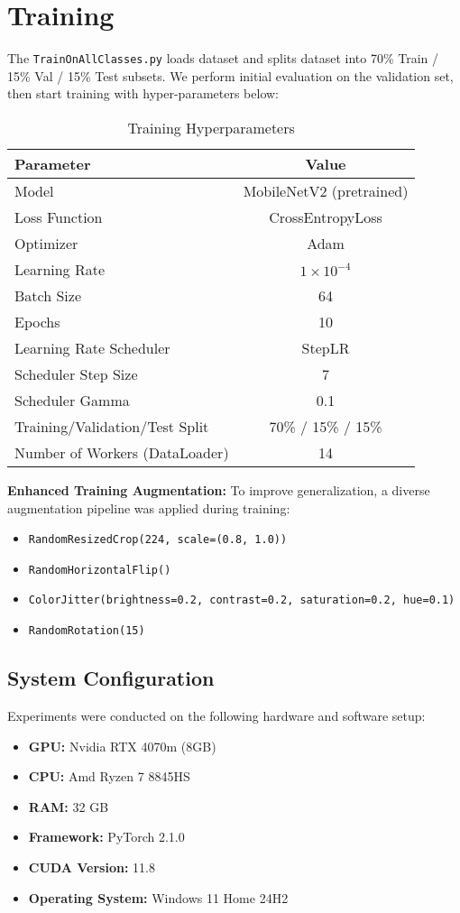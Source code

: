 \documentclass[a4paper,12pt]{report}%
\begin{document}
\section{Training}
The \texttt{TrainOnAllClasses.py} loads dataset and splits dataset into 70\% Train / 15\% Val / 15\% Test subsets. We perform initial evaluation on the validation set, then start training with hyper-parameters below:
\begin{table}[H]
\centering
\caption{Training Hyperparameters}
\begin{tabular}{|l|c|}
\hline
\textbf{Parameter} & \textbf{Value} \\
\hline
Model & MobileNetV2 (pretrained) \\
Loss Function & CrossEntropyLoss \\
Optimizer & Adam \\
Learning Rate & $1 \times 10^{-4}$ \\
Batch Size & 64 \\
Epochs & 10 \\
Learning Rate Scheduler & StepLR \\
Scheduler Step Size & 7 \\
Scheduler Gamma & 0.1 \\
Training/Validation/Test Split & 70\% / 15\% / 15\% \\
Number of Workers (DataLoader) & 14 \\
\hline
\end{tabular}
\end{table}

\textbf{Enhanced Training Augmentation:} To improve generalization, a diverse augmentation pipeline was applied during training:
\begin{itemize}
  \item \texttt{RandomResizedCrop(224, scale=(0.8, 1.0))}
  \item \texttt{RandomHorizontalFlip()}
  \item \texttt{ColorJitter(brightness=0.2, contrast=0.2, saturation=0.2, hue=0.1)}
  \item \texttt{RandomRotation(15)}
\end{itemize}


\subsection{System Configuration}
Experiments were conducted on the following hardware and software setup:

\begin{itemize}
    \item \textbf{GPU:} Nvidia RTX 4070m (8GB)
    \item \textbf{CPU:} Amd Ryzen 7 8845HS
    \item \textbf{RAM:} 32 GB
    \item \textbf{Framework:} PyTorch 2.1.0
    \item \textbf{CUDA Version:} 11.8
    \item \textbf{Operating System:} Windows 11 Home 24H2
\end{itemize}
\end{document}
